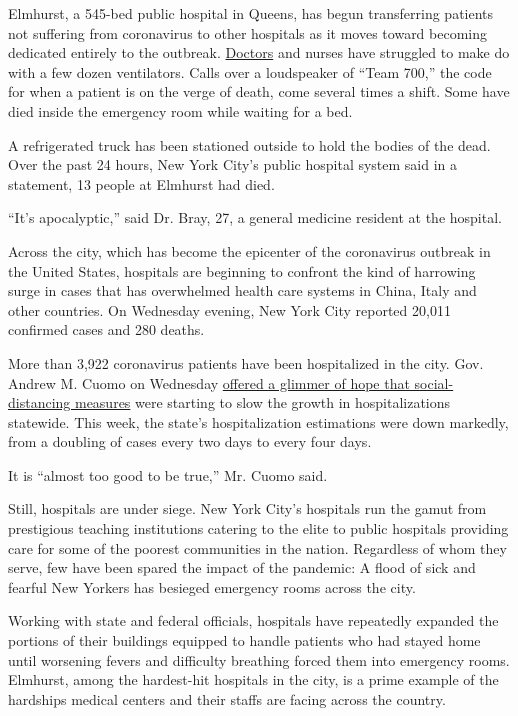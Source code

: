 Elmhurst, a 545-bed public hospital in Queens, has begun transferring
patients not suffering from coronavirus to other hospitals as it moves
toward becoming dedicated entirely to the outbreak.
\href{https://www.nytimes3xbfgragh.onion/2020/04/14/us/armen-henderson-arrested-homeless-coronavirus-testing.html}{Doctors}
and nurses have struggled to make do with a few dozen ventilators. Calls
over a loudspeaker of ``Team 700,'' the code for when a patient is on
the verge of death, come several times a shift. Some have died inside
the emergency room while waiting for a bed.

A refrigerated truck has been stationed outside to hold the bodies of
the dead. Over the past 24 hours, New York City's public hospital system
said in a statement, 13 people at Elmhurst had died.

``It's apocalyptic,'' said Dr. Bray, 27, a general medicine resident at
the hospital.

Across the city, which has become the epicenter of the coronavirus
outbreak in the United States, hospitals are beginning to confront the
kind of harrowing surge in cases that has overwhelmed health care
systems in China, Italy and other countries. On Wednesday evening, New
York City reported 20,011 confirmed cases and 280 deaths.

More than 3,922 coronavirus patients have been hospitalized in the city.
Gov. Andrew M. Cuomo on Wednesday
\href{https://www.nytimes3xbfgragh.onion/2020/03/25/nyregion/coronavirus-new-york-update.html}{offered
a glimmer of hope that social-distancing measures} were starting to slow
the growth in hospitalizations statewide. This week, the state's
hospitalization estimations were down markedly, from a doubling of cases
every two days to every four days.

It is ``almost too good to be true,'' Mr. Cuomo said.

Still, hospitals are under siege. New York City's hospitals run the
gamut from prestigious teaching institutions catering to the elite to
public hospitals providing care for some of the poorest communities in
the nation. Regardless of whom they serve, few have been spared the
impact of the pandemic: A flood of sick and fearful New Yorkers has
besieged emergency rooms across the city.

Working with state and federal officials, hospitals have repeatedly
expanded the portions of their buildings equipped to handle patients who
had stayed home until worsening fevers and difficulty breathing forced
them into emergency rooms. Elmhurst, among the hardest-hit hospitals in
the city, is a prime example of the hardships medical centers and their
staffs are facing across the country.

